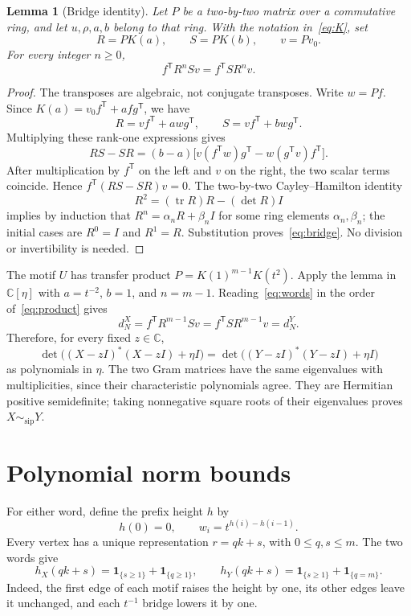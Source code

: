\documentclass[11pt,a4paper]{article}
\newtheorem{lemma}[theorem]{Lemma}
\newcommand{\ind}[1]{\mathbf{1}_{\{#1\}}}
\newcommand{\sip}{\sim_{\mathrm{sip}}}
\begin{document}
\begin{lemma}[Bridge identity]\label{lem:bridge}
Let $P$ be a two-by-two matrix over a commutative ring, and let $u,\rho,a,b$
belong to that ring. With the notation in~\eqref{eq:K}, set
\[
 R=PK(a),\qquad S=PK(b),\qquad v=Pv_0.
\]
For every integer $n\ge0$,
\begin{equation}\label{eq:bridge}
 f^{\mathsf T}R^nSv=f^{\mathsf T}SR^nv.
\end{equation}
\end{lemma}
\begin{proof}
The transposes are algebraic, not conjugate transposes. Write $w=Pf$.
Since $K(a)=v_0f^{\mathsf T}+a f g^{\mathsf T}$, we have
\[
 R=vf^{\mathsf T}+a w g^{\mathsf T},\qquad
 S=vf^{\mathsf T}+b w g^{\mathsf T}.
\]
Multiplying these rank-one expressions gives
\[
 RS-SR=(b-a)\bigl[v(f^{\mathsf T}w)g^{\mathsf T}
                       -w(g^{\mathsf T}v)f^{\mathsf T}\bigr].
\]
After multiplication by $f^{\mathsf T}$ on the left and $v$ on the right,
the two scalar terms coincide. Hence $f^{\mathsf T}(RS-SR)v=0$.
The two-by-two Cayley--Hamilton identity
\[
 R^2=(\operatorname{tr}R)R-(\det R)I
\]
implies by induction that $R^n=\alpha_n R+\beta_n I$ for some ring elements
$\alpha_n,\beta_n$; the initial cases are $R^0=I$ and $R^1=R$.
Substitution proves~\eqref{eq:bridge}. No division or invertibility is needed.
\end{proof}

The motif $U$ has transfer product $P=K(1)^{m-1}K(t^2)$.
Apply the lemma in $\mathbb C[\eta]$ with $a=t^{-2}$, $b=1$, and $n=m-1$.
Reading~\eqref{eq:words} in the order of~\eqref{eq:product} gives
\[
 d_N^X=f^{\mathsf T}R^{m-1}Sv
      =f^{\mathsf T}SR^{m-1}v=d_N^Y.
\]
Therefore, for every fixed $z\in\mathbb C$,
\begin{equation}\label{eq:Gram}
 \det\bigl((X-zI)^*(X-zI)+\eta I\bigr)
 =\det\bigl((Y-zI)^*(Y-zI)+\eta I\bigr)
\end{equation}
as polynomials in $\eta$. The two Gram matrices have the same eigenvalues
with multiplicities, since their characteristic polynomials agree.
They are Hermitian positive semidefinite; taking nonnegative square roots
of their eigenvalues proves $X\sip Y$.

\section{Polynomial norm bounds}
For either word, define the prefix height $h$ by
\[
 h(0)=0,\qquad w_i=t^{h(i)-h(i-1)}.
\]
Every vertex has a unique representation $r=qk+s$, with $0\le q,s\le m$.
The two words give
\begin{equation}\label{eq:heights}
 h_X(qk+s)=\ind{s\ge1}+\ind{q\ge1},\qquad
 h_Y(qk+s)=\ind{s\ge1}+\ind{q=m}.
\end{equation}
Indeed, the first edge of each motif raises the height by one, its other
edges leave it unchanged, and each $t^{-1}$ bridge lowers it by one.
\end{document}

